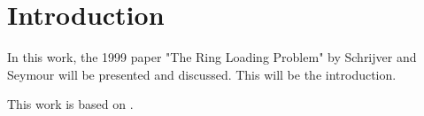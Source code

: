 \section{Introduction}

In this work, the 1999 paper "The Ring Loading Problem" by Schrijver and Seymour will be presented and discussed.
This will be the introduction.

This work is based on \citet{schrijver99}.

